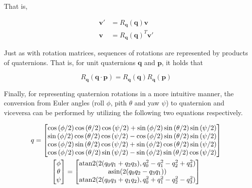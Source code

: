 \noindent That is,

\begin{align}
	\mathbf{v}' &= R_{\mathbf{q}}(\mathbf{q})\mathbf{v} \\
	\mathbf{v} &= R_{\mathbf{q}}(\mathbf{q})^T\mathbf{v}'
	\label{eq:quatRotationMatrix3}
\end{align}

\noindent Just as with rotation matrices, sequences of rotations are represented by products of quaternions. That is, for unit quaternions $\mathbf{q}$ and $\mathbf{p}$, it holds that

\begin{equation}
	R_{\mathbf{q}}(\mathbf{q} \cdot \mathbf{p}) = R_{\mathbf{q}}(\mathbf{q})R_{\mathbf{q}}(\mathbf{p})
	\label{eq:quatRotationMatrix4}
\end{equation}

\noindent Finally, for representing quaternion rotations in a more intuitive manner, the conversion from Euler angles (roll $\phi$, pith $\theta$ and yaw $\psi$) to quaternion and viceversa can be performed by utilizing the following two equations respectively.

\begin{gather}
	q = 
	\begin{bmatrix}
		\cos{(\phi/2)}\cos{(\theta/2)}\cos{(\psi/2)} + \sin{(\phi/2)}\sin{(\theta/2)}\sin{(\psi/2)} \\
		\sin{(\phi/2)}\cos{(\theta/2)}\cos{(\psi/2)} - \cos{(\phi/2)}\sin{(\theta/2)}\sin{(\psi/2)} \\
		\cos{(\phi/2)}\sin{(\theta/2)}\cos{(\psi/2)} + \sin{(\phi/2)}\cos{(\theta/2)}\sin{(\psi/2)} \\
		\cos{(\phi/2)}\cos{(\theta/2)}\sin{(\psi/2)} - \sin{(\phi/2)}\sin{(\theta/2)}\cos{(\psi/2)} 
	\end{bmatrix} \\
	\begin{bmatrix}
		\phi \\
		\theta \\
		\psi
	\end{bmatrix}
	=
	\begin{bmatrix}
		\atan2(2(q_0q_1+q_2q_3), q_0^2-q_1^2-q_2^2+q_3^2) \\
		\asin(2(q_0q_2-q_3q_1)) \\
		\atan2(2(q_0q_3+q_1q_2), q_0^2+q_1^2-q_2^2-q_3^2)
	\end{bmatrix}
	\label{eq:quatEuler}
\end{gather}

\phantom{x} %

